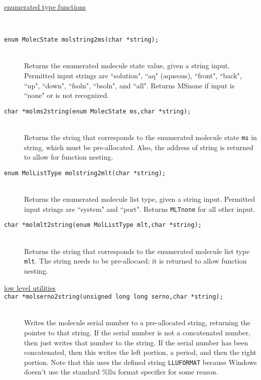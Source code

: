 \documentclass {book}
\begin{document}
\begin{description}

\item[\underline{enumerated type functions}]
\hfill \\

\item[\texttt{enum MolecState molstring2ms(char *string);}]
\hfill \\
Returns the enumerated molecule state value, given a string input. Permitted input strings are ``solution", ``aq" (aqueous), ``front", ``back", ``up", ``down", ``fsoln", ``bsoln", and ``all". Returns MSnone if input is ``none" or is not recognized.

\item[\texttt{char *molms2string(enum MolecState ms,char *string);}]
\hfill \\
Returns the string that corresponds to the enumerated molecule state \texttt{ms} in string, which must be pre-allocated. Also, the address of string is returned to allow for function nesting.

\item[\texttt{enum MolListType molstring2mlt(char *string);}]
\hfill \\
Returns the enumerated molecule list type, given a string input. Permitted input strings are ``system" and ``port". Returns \texttt{MLTnone} for all other input.

\item[\texttt{char *molmlt2string(enum MolListType mlt,char *string);}]
\hfill \\
Returns the string that corresponds to the enumerated molecule list type \texttt{mlt}. The string needs to be pre-allocaed; it is returned to allow function nesting.

\item[\underline{low level utilities}]

\item[\texttt{char *molserno2string(unsigned long long serno,char *string);}]
\hfill \\
Writes the molecule serial number to a pre-allocated string, returning the pointer to that string. If the serial number is not a concatenated number, then just writes that number to the string. If the serial number has been concatenated, then this writes the left portion, a period, and then the right portion. Note that this uses the defined string \texttt{LLUFORMAT} because Windows doesn't use the standard \%llu format specifier for some reason.


\end{description}
\end{document}

